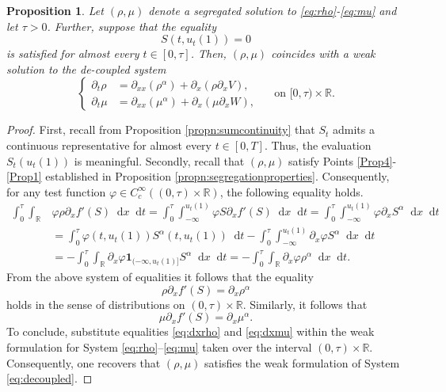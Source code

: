 \documentclass[a4paper,twosided, 11pt]{article}
\newcommand{\R}{\mathbb{R}}
\theoremstyle{plain}
\newtheorem{proposition}[thm]{Proposition}
\theoremstyle{remark}
\newcommand{\one}{\mathbf{1}}
\newcommand{\diff}{\mathop{} \mathrm{d}}
\numberwithin{equation}{section}
\begin{document}
\begin{proposition}\label{propn:separate}
    Let $(\rho,\mu)$ denote a segregated solution to \eqref{eq:rho}-\eqref{eq:mu} and let $\tau > 0$. 
    Further, suppose that the equality
    \[
     S(t, u_t(1)) = 0
    \]
    is satisfied for almost every $t \in [0,\tau]$.
    Then, $(\rho,\mu)$ coincides with a weak solution to the de-coupled system
    \begin{equation}\label{eq:decoupled}
    \begin{cases}
        \partial_t \rho &= \partial_{xx}(\rho^\alpha) + \partial_x(\rho\partial_x V), \\
          \partial_t \mu &= \partial_{xx} (\mu^\alpha) + \partial_x(\mu\partial_x W),    
    \end{cases}
    \quad \text{ on } [0,\tau) \times \R.
    \end{equation}
\end{proposition}
\begin{proof}
First, recall from Proposition \ref{propn:sumcontinuity} that $S_t$ admits a continuous representative for almost every $t \in [0,T]$. 
Thus, the evaluation $S_t(u_t(1))$ is meaningful.
Secondly, recall that $(\rho,\mu)$ satisfy Points \ref{Prop4}- \ref{Prop1} established in Proposition \ref{propn:segregationproperties}. 
Consequently, for any test function $\varphi \in C_c^\infty ((0,\tau)\times \R)$, the following equality holds.
\begin{align*}
    \int_0^{\tau}\int_{\R} & \varphi \rho \partial_x f'(S)   \diff x \diff t = \int_0^{\tau}\int_{-\infty}^{u_t(1)}\varphi S\partial_x f'(S) \diff x \diff t =  \int_0^{\tau}\int_{-\infty}^{u_t(1)} \varphi \partial_x S^\alpha  \diff x \diff t\\
    & = \int_0^{\tau}\varphi(t,u_t(1)) S^\alpha(t,u_t(1)) \diff t- \int_0^{\tau}\int_{-\infty}^{u_t(1)} \partial_x \varphi S^\alpha   \diff x \diff t\\
    & = - \int_0^{\tau}\int_{\R} \partial_x \varphi \one_{(-\infty,u_t(1)]} S^\alpha  \diff x \diff t= - \int_0^{\tau}\int_{\R} \partial_x \varphi \rho^\alpha \diff x \diff t.
\end{align*}
From the above system of equalities it follows that the equality 
\begin{equation}\label{eq:dxrho}
\rho\partial_x f'(S) = \partial_x \rho^\alpha
\end{equation}
holds in the sense of distributions on $(0,\tau) \times \R$.
Similarly, it follows that
\begin{equation}\label{eq:dxmu}
\mu\partial_x f'(S) = \partial_x \mu^\alpha.
\end{equation}
To conclude, substitute equalities \eqref{eq:dxrho} and \eqref{eq:dxmu} within the weak formulation for System  \eqref{eq:rho}--\eqref{eq:mu} taken over the interval $(0,\tau)\times \R$.
Consequently, one recovers that $(\rho,\mu)$ satisfies the weak formulation of System \eqref{eq:decoupled}.
\end{proof}
\end{document}
